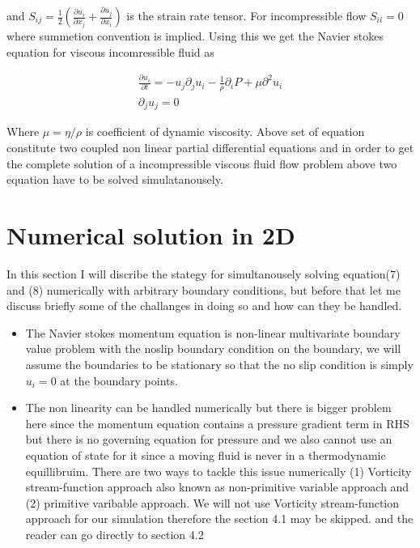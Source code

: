 \documentclass{article}		%
\begin{document}
	and $S_{ij} = \frac{1}{2} \left( \frac{\partial u_i }{\partial x_j} + \frac{\partial u_j }{\partial x_i} \right) $ is the strain rate tensor. For incompressible flow $S_{ii}=0$ where summetion convention is implied. Using this we get the Navier stokes equation for viscous incomressible fluid as 
	
	\begin{eqnarray}
	\frac{\partial  u_i }{\partial t} = - u_j\partial_j  u_i - \frac{1}{\rho} \partial_iP  + \mu \partial^2 u_i\\
	\partial_j u_j =0 
	\end{eqnarray}	
	
	Where $\mu =  \eta /\rho $ is coefficient of dynamic viscosity. Above set of equation constitute two coupled non linear partial differential equations and in order to get the complete solution of a incompressible viscous fluid flow problem above two equation have to be solved simulatanousely.
	
\newpage 

\section{Numerical solution in 2D}

In this section I will discribe the stategy for simultanousely solving equation(7) and (8) numerically with arbitrary boundary conditions, but before that let me discuss briefly some of the challanges in doing so and how can they be handled.

\begin{itemize}
	\item The Navier stokes momentum equation is non-linear multivariate boundary value problem with the noslip boundary condition on the boundary, we will assume the boundaries to be stationary so that the no slip condition is simply $u_i =0 $ at the boundary points.
	
	\item The non linearity can be handled numerically but there is bigger problem here since the momentum equation contains a pressure gradient term in RHS but there is no governing equation for pressure and we also cannot use an equation of state for it since a moving fluid is never in a thermodynamic equillibruim. There are two ways to tackle this issue numerically (1) Vorticity stream-function approach also known as non-primitive variable approach and (2) primitive varibable approach. We will not use Vorticity stream-function approach for our simulation therefore the section 4.1 may be skipped. and the reader can go directly to section 4.2
	
\end{itemize}
\end{document}
